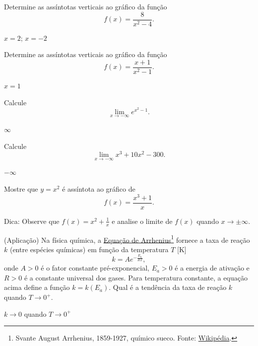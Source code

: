 \begin{exer}
  Determine as assíntotas verticais ao gráfico da função
  \begin{equation}
    f(x) = \frac{8}{x^2-4}.
  \end{equation}
\end{exer}
\begin{resp}
  $x=2$; $x=-2$
\end{resp}

\begin{exer}
  Determine as assíntotas verticais ao gráfico da função
  \begin{equation}
    f(x) = \frac{x+1}{x^2-1}.
  \end{equation}
\end{exer}
\begin{resp}
  $x=1$
\end{resp}

\begin{exer}
  Calcule
  \begin{equation}
    \lim_{x\to -\infty} e^{x^2-1}.
  \end{equation}
\end{exer}
\begin{resp}
  $\infty$
\end{resp}

\begin{exer}
  Calcule
  \begin{equation}
    \lim_{x\to -\infty} x^3 + 10x^2 - 300.
  \end{equation}
\end{exer}
\begin{resp}
  $-\infty$
\end{resp}

\begin{exer}
  Mostre que $y = x^2$ é assíntota ao gráfico de
  \begin{equation}
    f(x) = \frac{x^3+1}{x}.
  \end{equation}
\end{exer}
\begin{resp}
  Dica: Observe que $f(x) = x^2 + \frac{1}{x}$ e analise o limite de $f(x)$ quando $x\to\pm\infty$.
\end{resp}

\begin{exer}(Aplicação)
  Na física química, a \href{https://pt.wikipedia.org/wiki/Equa\%C3\%A7\%C3\%A3o\_de\_Arrhenius}{Equação de Arrhenius}\footnote{Svante August Arrhenius, 1859-1927, químico sueco. Fonte: \href{https://pt.wikipedia.org/wiki/Svante\_Arrhenius}{Wikipédia}.} fornece a taxa de reação $k$ (entre espécies químicas) em função da temperatura $T$ [K]
  \begin{equation}
    k = Ae^{-\frac{E_a}{RT}}, 
  \end{equation}
  onde $A>0$ é o fator constante pré-exponencial, $E_a>0$ é a energia de ativação e $R>0$ é a constante universal dos gases. Para temperatura constante, a equação acima define a função $k = k(E_a)$. Qual é a tendência da taxa de reação $k$ quando $T\to 0^+$. 
\end{exer}
\begin{resp}
  $k\to 0$ quando $T\to 0^+$
\end{resp}

